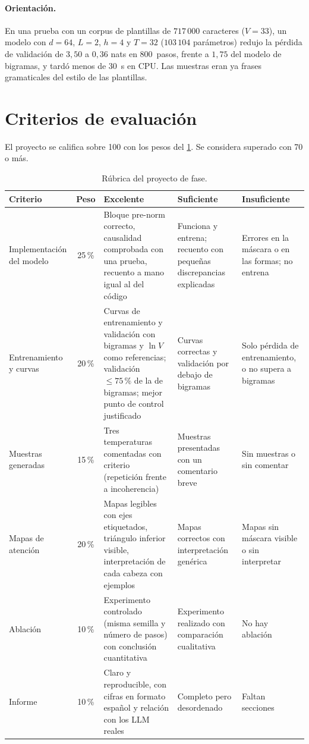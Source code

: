 \paragraph{Orientación.} En una prueba con un corpus de plantillas de $717\,000$ caracteres ($V=33$), un modelo con $d=64$, $L=2$, $h=4$ y $T=32$ ($103\,104$ parámetros) redujo la pérdida de validación de $3{,}50$ a $0{,}36$ nats en 800~pasos, frente a $1{,}75$ del modelo de bigramas, y tardó menos de 30~s en CPU. Las muestras eran ya frases gramaticales del estilo de las plantillas.

\section*{Criterios de evaluación}
El proyecto se califica sobre 100 con los pesos del \cref{tab:rubrica}. Se considera superado con 70 o más.

\begin{table}[ht]
\centering\footnotesize
\renewcommand{\arraystretch}{1.15}
\caption{Rúbrica del proyecto de fase.}\label{tab:rubrica}
\begin{tabularx}{\textwidth}{@{}>{\raggedright\arraybackslash}p{2.45cm}c>{\raggedright\arraybackslash}X>{\raggedright\arraybackslash}X>{\raggedright\arraybackslash}X@{}}
\toprule
Criterio & Peso & Excelente & Suficiente & Insuficiente \\
\midrule
Implementación del modelo & 25\,\% & Bloque pre-norm correcto, causalidad comprobada con una prueba, recuento a mano igual al del código & Funciona y entrena; recuento con pequeñas discrepancias explicadas & Errores en la máscara o en las formas; no entrena \\
\addlinespace
Entrenamiento y curvas & 20\,\% & Curvas de entrenamiento y validación con bigramas y $\ln V$ como referencias; validación $\le 75\,\%$ de la de bigramas; mejor punto de control justificado & Curvas correctas y validación por debajo de bigramas & Solo pérdida de entrenamiento, o no supera a bigramas \\
\addlinespace
Muestras generadas & 15\,\% & Tres temperaturas comentadas con criterio (repetición frente a incoherencia) & Muestras presentadas con un comentario breve & Sin muestras o sin comentar \\
\addlinespace
Mapas de atención & 20\,\% & Mapas legibles con ejes etiquetados, triángulo inferior visible, interpretación de cada cabeza con ejemplos & Mapas correctos con interpretación genérica & Mapas sin máscara visible o sin interpretar \\
\addlinespace
Ablación & 10\,\% & Experimento controlado (misma semilla y número de pasos) con conclusión cuantitativa & Experimento realizado con comparación cualitativa & No hay ablación \\
\addlinespace
Informe & 10\,\% & Claro y reproducible, con cifras en formato español y relación con los LLM reales & Completo pero desordenado & Faltan secciones \\
\bottomrule
\end{tabularx}
\end{table}
